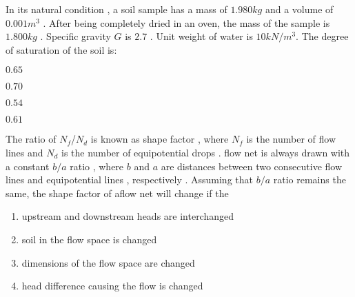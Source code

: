 \item In its natural condition , a soil sample  has a mass of $1.980kg$ and a volume of $0.001m^3$ . After being completely dried in an oven, the mass of the sample is $1.800kg$ . Specific gravity $G$ is $2.7$ . Unit weight of water is $10kN/m^3$. The degree of saturation of the soil is:  
\begin{enumerate}
\begin{multicols}{2}
\item  $ 0.65 $
\item $ 0.70 $
\item $ 0.54 $
\item $ 0.61 $
\end{multicols}
\end{enumerate}
\item The ratio of $N_f$/$N_d$ is known as shape factor , where $N_f$ is the number of flow lines and $N_d$ is the number of equipotential drops .  flow net is always drawn with a constant $b/a$ ratio , where $b$ and $a$ are distances between two consecutive flow lines and equipotential lines , respectively . Assuming that $b/a$ ratio remains the same, the shape factor of aflow net will change if the
\begin{enumerate}
\item upstream and downstream heads are interchanged
\item soil in the flow space is changed 
\item dimensions of the flow space are changed
\item head difference causing the flow is changed  
\end{enumerate}
     
